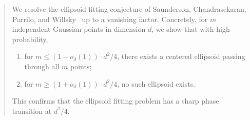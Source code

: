 \documentclass[12pt]{article}
\def \al {\alpha}
\newcommand{\Lovasz}{Lov\'asz\xspace}
\newcommand{\Authornote}[3]{{\sf\footnotesize\color{#3}{[#1: #2]}}}
\newcommand{\Authornote}[3]{}
\newcommand{\jnote}[1]{\Authornote{Jeff}{#1}{blue}}
\newcommand{\anote}[1]{\Authornote{Aaron}{#1}{cyan}}
\newcommand{\snote}[1]{\Authornote{Sofia}{#1}{orange}}
\begin{document}
\begin{abstract}
	We resolve the ellipsoid fitting conjecture of Saunderson,
Chandrasekaran, Parrilo, and Willsky~\cite{SCPW12} up to a vanishing
factor.
Concretely, for $m$ independent Gaussian points in dimension $d$, we show that with high probability,\begin{enumerate}
	\item for $m \leq (1-o_d(1)) \cdot d^2/4$, there exists a centered ellipsoid passing through all $m$ points;
	\item for $m\geq (1+o_d(1) )\cdot d^2/4$, no such ellipsoid exists.
\end{enumerate}
This confirms that the ellipsoid fitting problem has a sharp phase transition at $d^2/4$.
%
%





\end{abstract}
\end{document}
